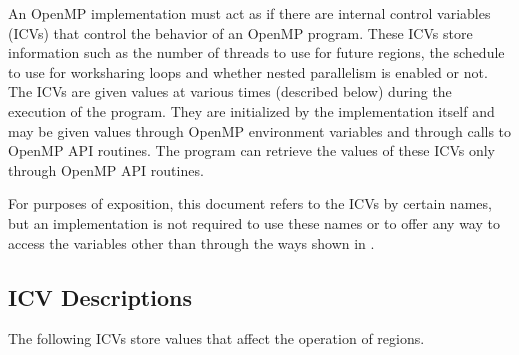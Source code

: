An OpenMP implementation must act as if there are internal control variables (ICVs)
that control the behavior of an OpenMP program. These ICVs store information such as
the number of threads to use for future  regions, the schedule to use 
for worksharing loops and whether nested parallelism is enabled or not. The ICVs are 
given values at various times (described below) during the execution of the program. 
They are initialized by the implementation itself and may be given values through 
OpenMP environment variables and through calls to OpenMP API routines. The program 
can retrieve the values of these ICVs only through OpenMP API routines.

For purposes of exposition, this document refers to the ICVs by certain names, but an
implementation is not required to use these names or to offer any way to access the
variables other than through the ways shown in
.








\subsection{ICV Descriptions}
\label{subsec:ICV Descriptions}
The following ICVs store values that affect the operation of  regions.

